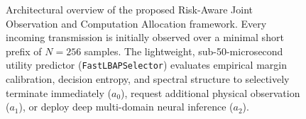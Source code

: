 \begin{figure}[!t]
{%
}
\caption{Architectural overview of the proposed Risk-Aware Joint Observation and Computation Allocation framework. Every incoming transmission is initially observed over a minimal short prefix of $N=256$ samples. The lightweight, sub-50-microsecond utility predictor (\texttt{FastLBAPSelector}) evaluates empirical margin calibration, decision entropy, and spectral structure to selectively terminate immediately ($a_0$), request additional physical observation ($a_1$), or deploy deep multi-domain neural inference ($a_2$).}
\label{fig:framework_overview}
\end{figure}

